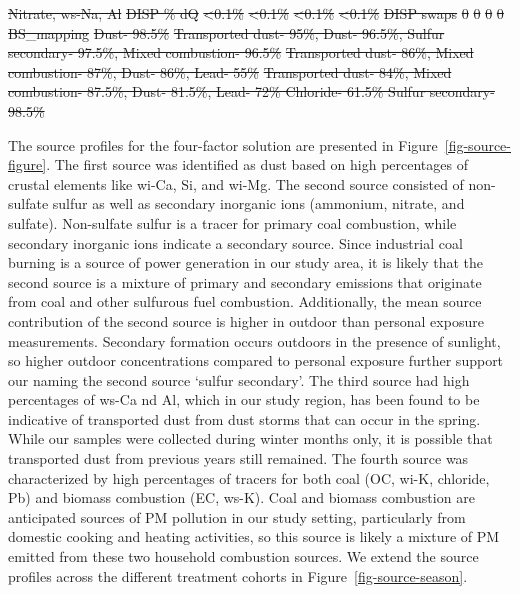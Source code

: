\documentclass[
  letterpaper,
  DIV=11,
  numbers=noendperiod]{scrartcl}
\makeatletter
\renewenvironment{table}%
   {\renewcommand\familydefault\sfdefault
    \@float{table}}
   {\end@float}
\providecommand{\DIFdeltex}[1]{{\protect\color{red}\sout{#1}}}                      %
\providecommand{\DIFdelFL}[1]{\DIFdel{#1}} %
\providecommand{\DIFaddbeginFL}{} %
\providecommand{\DIFaddendFL}{} %
\providecommand{\DIFdelendFL}{} %
\providecommand{\DIFdel}[1]{\texorpdfstring{\DIFdeltex{#1}}{}} %
\newcommand{\DIFaddincludegraphics}[2][]{{\color{blue}\fbox{\DIFOincludegraphics[#1]{#2}}}} %
\DeclareRobustCommand{\DIFaddbeginFL}{\DIFOaddbeginFL \let\includegraphics\DIFaddincludegraphics} %
\DeclareRobustCommand{\DIFaddendFL}{\DIFOaddendFL \let\includegraphics\DIFOincludegraphics} %
\DeclareRobustCommand{\DIFdelendFL}{\DIFOaddendFL \let\includegraphics\DIFOincludegraphics} %
\makeatother
\begin{document}
\begin{table}
\DIFdelFL{Nitrate, ws-Na, Al}%
\DIFdelFL{DISP \% dQ }%
\DIFdelFL{<0.1\% }%
\DIFdelFL{<0.1\% }%
\DIFdelFL{<0.1\% }%
\DIFdelFL{<0.1\%}%
\DIFdelFL{DISP swaps }%
\DIFdelFL{0 }%
\DIFdelFL{0 }%
\DIFdelFL{0 }%
\DIFdelFL{0}%
\DIFdelFL{BS\_mapping }%
\DIFdelFL{Dust- 98.5\% }%
\DIFdelFL{Transported dust- 95\%, Dust- 96.5\%, Sulfur secondary- 97.5\%, Mixed combustion- 96.5\% }%
\DIFdelFL{Transported dust- 86\%, Mixed combustion- 87\%, Dust- 86\%, Lead- 55\% }%
\DIFdelFL{Transported dust- 84\%, Mixed combustion- 87.5\%, Dust- 81.5\%, Lead- 72\%
Chloride- 61.5\%
Sulfur secondary- 98.5\%}%
\DIFdelendFL \DIFaddbeginFL \centering{

}

\DIFaddendFL \end{table}%

The source profiles for the four-factor solution are presented in
Figure~\ref{fig-source-figure}. The first source was identified as dust
based on high percentages of crustal elements like wi-Ca, Si, and wi-Mg.
The second source consisted of non-sulfate sulfur as well as secondary
inorganic ions (ammonium, nitrate, and sulfate). Non-sulfate sulfur is a
tracer for primary coal combustion, while secondary inorganic ions
indicate a secondary source. Since industrial coal burning is a source
of power generation in our study area, it is likely that the second
source is a mixture of primary and secondary emissions that originate
from coal and other sulfurous fuel combustion. Additionally, the mean
source contribution of the second source is higher in outdoor than
personal exposure measurements. Secondary formation occurs outdoors in
the presence of sunlight, so higher outdoor concentrations compared to
personal exposure further support our naming the second source `sulfur
secondary'. The third source had high percentages of ws-Ca nd Al, which
in our study region, has been found to be indicative of transported dust
from dust storms that can occur in the spring. While our samples were
collected during winter months only, it is possible that transported
dust from previous years still remained. The fourth source was
characterized by high percentages of tracers for both coal (OC, wi-K,
chloride, Pb) and biomass combustion (EC, ws-K). Coal and biomass
combustion are anticipated sources of PM pollution in our study setting,
particularly from domestic cooking and heating activities, so this
source is likely a mixture of PM emitted from these two household
combustion sources. We extend the source profiles across the different
treatment cohorts in Figure~\ref{fig-source-season}.
\end{document}

